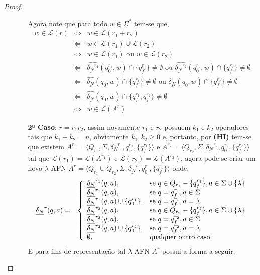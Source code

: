\begin{proof}
\begin{itemize}
\begin{itemize}
			Agora note que para todo $w \in \Sigma^*$ tem-se que,
			\begin{eqnarray*}
				w \in \mathcal{L}(r) & \Longleftrightarrow & w \in \mathcal{L}(r_1 + r_2)\\
				& \Longleftrightarrow & w \in \mathcal{L}(r_1) \cup  \mathcal{L}(r_2)\\
				& \Longleftrightarrow & w \in \mathcal{L}(r_1) \text{ ou } w \in \mathcal{L}(r_2)\\
				& \Longleftrightarrow & \widehat{\underline{\delta_N}^{r_1}}(q_0^{r_1}, w) \cap \{q_f^{r_1}\} \neq \emptyset \text{ ou } \widehat{\underline{\delta_N}^{r_2}}(q_0^{r_2}, w) \cap \{q_f^{r_2}\} \neq \emptyset\\
				& \Longleftrightarrow & \widehat{\underline{\delta_N}}(q_0, w) \cap \{q_f^{r_1}\} \neq \emptyset \text{ ou } \widehat{\underline{\delta_N}}(q_0, w) \cap \{q_f^{r_2}\} \neq \emptyset\\
				& \Longleftrightarrow & \widehat{\underline{\delta_N}}(q_0, w) \cap \{q_f^{r_1}, q_f^{r_2}\} \neq \emptyset\\
				& \Longleftrightarrow & w \in \mathcal{L}(A^r)
			\end{eqnarray*}
			
			\item[\textbf{2º}] \textbf{Caso}: $r = r_1r_2$, assim novamente $r_1$ e $r_2$ possuem $k_1$ e $k_2$ operadores tais que $k_1 + k_2 = n$, obviamente $k_1, k_2 \geq 0$ e, portanto, por \textbf{(HI)} tem-se que existem $A^{r_1} = \langle Q_{r_1}, \Sigma, \underline{\delta_N}^{r_1}, q_0^{r_1}, \{q_f^{r_1}\}\rangle$ e $A^{r_2} = \langle Q_{r_2}, \Sigma, \underline{\delta_N}^{r_2}, q_0^{r_2}, \{q_f^{r_2}\}\rangle$  tal que $\mathcal{L}(r_1) = \mathcal{L}(A^{r_1})$ e $\mathcal{L}(r_2) = \mathcal{L}(A^{r_2})$, agora pode-se criar um novo $\lambda$-AFN $A^r = \langle Q_{r_1} \cup Q_{r_2}, \Sigma, \underline{\delta_N}^r, q_0^{r_1}, \{q_f^{r_2}\}\rangle$ onde,
			\begin{eqnarray*}
				\underline{\delta_N}^r(q, a) & = & 
				\left\{\begin{array}{ll}	
					\underline{\delta_N}^{r_1}(q, a), & \hbox{se } q \in Q_{r_1} - \{q^{r_1}_f\}, a \in \Sigma \cup \{\lambda\}\\
					\underline{\delta_N}^{r_1}(q, a), & \hbox{se } q = q^{r_1}_f, a \in \Sigma\\
					\underline{\delta_N}^{r_1}(q, a) \cup \{q^{r_1}_0\}, & \hbox{se } q = q^{r_1}_f, a = \lambda\\
					\underline{\delta_N}^{r_2}(q, a), & \hbox{se } q \in Q_{r_2} - \{q^{r_2}_f\}, a \in \Sigma \cup \{\lambda\}\\
					\underline{\delta_N}^{r_2}(q, a), & \hbox{se } q = q^{r_2}_f, a \in \Sigma\\
					\underline{\delta_N}^{r_2}(q, a) \cup \{q^{r_2}_0\}, & \hbox{se } q = q^{r_2}_f, a = \lambda\\
					\emptyset, & \hbox{qualquer outro caso}
				\end{array}\right.
			\end{eqnarray*}
			E para fins de representação tal $\lambda$-AFN $A^r$ possui a forma a seguir.
			

\end{itemize}
\end{itemize}
\end{proof}
